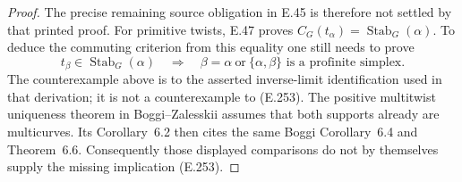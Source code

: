 \begin{proof}
The precise remaining source obligation in E.45 is
therefore not settled by that printed proof.  For
primitive twists, E.47 proves
$C_G(t_\alpha)=\operatorname{Stab}_G(\alpha)$.
To deduce the commuting criterion from this equality
one still needs to prove
\[
 t_\beta\in\operatorname{Stab}_G(\alpha)
   \quad\Longrightarrow\quad
 \beta=\alpha\ \text{or}\ \{\alpha,\beta\}
                   \text{ is a profinite simplex}.         \tag{E.253}
\]
The counterexample above is to the asserted inverse-limit
identification used in that derivation; it is not a
counterexample to (E.253).  The positive multitwist
uniqueness theorem in Boggi--Zalesskii
\cite[Theorem~6.1]{ET_BZ2019Magnus} assumes that both
supports already are multicurves.  Its Corollary~6.2
then cites the same Boggi Corollary~6.4 and Theorem~6.6.
Consequently those displayed comparisons do not by
themselves supply the missing implication (E.253).
\end{proof}
